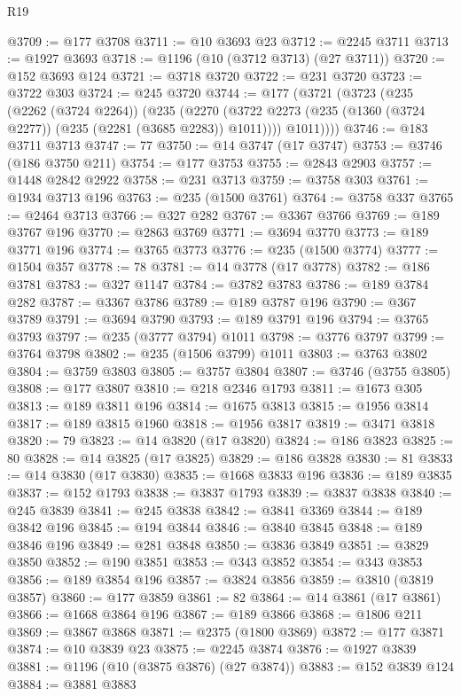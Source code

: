 \begin{lexlean}{R19}
\begin{coremodule}
@3709 := @177 @3708
@3711 := @10 @3693 @23
@3712 := @2245 @3711
@3713 := @1927 @3693
@3718 := @1196 (@10 (@3712 @3713) (@27 @3711))
@3720 := @152 @3693 @124
@3721 := @3718 @3720
@3722 := @231 @3720
@3723 := @3722 @303
@3724 := @245 @3720
@3744 := @177
    (@3721
      (@3723
        (@235
          (@2262 (@3724 @2264))
          (@235
            (@2270 (@3722 @2273 (@235 (@1360 (@3724 @2277)) (@235 (@2281 (@3685 @2283)) @1011))))
            @1011))))
@3746 := @183 @3711 @3713
@3747 := 77
@3750 := @14 @3747 (@17 @3747)
@3753 := @3746 (@186 @3750 @211)
@3754 := @177 @3753
@3755 := @2843 @2903
@3757 := @1448 @2842 @2922
@3758 := @231 @3713
@3759 := @3758 @303
@3761 := @1934 @3713 @196
@3763 := @235 (@1500 @3761)
@3764 := @3758 @337
@3765 := @2464 @3713
@3766 := @327 @282
@3767 := @3367 @3766
@3769 := @189 @3767 @196
@3770 := @2863 @3769
@3771 := @3694 @3770
@3773 := @189 @3771 @196
@3774 := @3765 @3773
@3776 := @235 (@1500 @3774)
@3777 := @1504 @357
@3778 := 78
@3781 := @14 @3778 (@17 @3778)
@3782 := @186 @3781
@3783 := @327 @1147
@3784 := @3782 @3783
@3786 := @189 @3784 @282
@3787 := @3367 @3786
@3789 := @189 @3787 @196
@3790 := @367 @3789
@3791 := @3694 @3790
@3793 := @189 @3791 @196
@3794 := @3765 @3793
@3797 := @235 (@3777 @3794) @1011
@3798 := @3776 @3797
@3799 := @3764 @3798
@3802 := @235 (@1506 @3799) @1011
@3803 := @3763 @3802
@3804 := @3759 @3803
@3805 := @3757 @3804
@3807 := @3746 (@3755 @3805)
@3808 := @177 @3807
@3810 := @218 @2346 @1793
@3811 := @1673 @305
@3813 := @189 @3811 @196
@3814 := @1675 @3813
@3815 := @1956 @3814
@3817 := @189 @3815 @1960
@3818 := @1956 @3817
@3819 := @3471 @3818
@3820 := 79
@3823 := @14 @3820 (@17 @3820)
@3824 := @186 @3823
@3825 := 80
@3828 := @14 @3825 (@17 @3825)
@3829 := @186 @3828
@3830 := 81
@3833 := @14 @3830 (@17 @3830)
@3835 := @1668 @3833 @196
@3836 := @189 @3835
@3837 := @152 @1793
@3838 := @3837 @1793
@3839 := @3837 @3838
@3840 := @245 @3839
@3841 := @245 @3838
@3842 := @3841 @3369
@3844 := @189 @3842 @196
@3845 := @194 @3844
@3846 := @3840 @3845
@3848 := @189 @3846 @196
@3849 := @281 @3848
@3850 := @3836 @3849
@3851 := @3829 @3850
@3852 := @190 @3851
@3853 := @343 @3852
@3854 := @343 @3853
@3856 := @189 @3854 @196
@3857 := @3824 @3856
@3859 := @3810 (@3819 @3857)
@3860 := @177 @3859
@3861 := 82
@3864 := @14 @3861 (@17 @3861)
@3866 := @1668 @3864 @196
@3867 := @189 @3866
@3868 := @1806 @211
@3869 := @3867 @3868
@3871 := @2375 (@1800 @3869)
@3872 := @177 @3871
@3874 := @10 @3839 @23
@3875 := @2245 @3874
@3876 := @1927 @3839
@3881 := @1196 (@10 (@3875 @3876) (@27 @3874))
@3883 := @152 @3839 @124
@3884 := @3881 @3883

\end{coremodule}
\end{lexlean}
